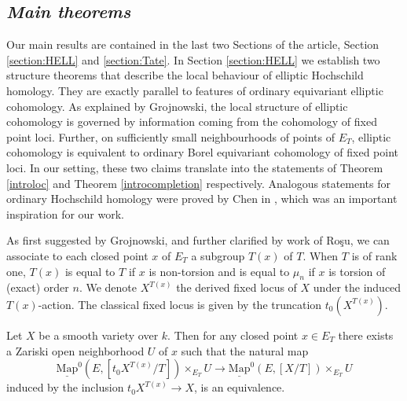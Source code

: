 \documentclass[11pt,letterpaper]{amsart}
\newenvironment{customthm}[1]
{\renewcommand\theinnercustomthm{#1}\innercustomthm}
  {\endinnercustomthm}
\newtheorem{remark}[dummy]{Remark}
\newcommand{\Mapo}[2]{\underline{\mathrm{Map}}^{0}\left (#1,#2\right )}
\begin{document}

\subsection*{\emph{Main theorems}} Our main results  are contained in the last two Sections of the article, Section \ref{section:HELL} and \ref{section:Tate}. 
In Section  \ref{section:HELL}  we establish two structure theorems that describe the local behaviour of elliptic Hochschild  homology. They are exactly parallel to features of ordinary equivariant elliptic cohomology. As explained by Grojnowski, the local structure of elliptic cohomology is governed by information coming from the cohomology of fixed point loci. Further, on sufficiently small   neighbourhoods of points of $E_T$, elliptic cohomology is equivalent to  ordinary Borel equivariant cohomology of fixed point loci. In our setting, these two claims translate into the statements of Theorem \ref{introloc} and Theorem \ref{introcompletion} respectively.   Analogous statements for ordinary Hochschild homology were proved by Chen in \cite{HChen}, which was an important inspiration for our work.

As first suggested by Grojnowski, and further clarified  by work of Ro\c{s}u, we can associate to each closed point $x$ of $E_T$ a subgroup $T(x)$ of $T$.  When $T$ is of rank one, $T(x)$ is  equal to $T$ if $x$ is non-torsion and is equal to 
$\mu_n$  %
if $x$ is torsion of (exact) order $n$. We denote $X^{T(x)}$ the derived fixed locus of $X$ under the induced $T(x)$-action. The classical fixed locus is given by the truncation $t_0(X^{T(x)})$.  

\begin{customthm}{E}
[Theorem \ref{proposition:localization}]
\label{introloc}
Let $X$ be a  smooth variety over $k$. Then for any closed point $x \in E_T$ there exists a Zariski open neighborhood $U$ of $x$ such that the natural map
\begin{equation}\label{eq:locmap}
\Mapo{E}{[t_0X^{T(x)}/T]}\times_{E_T} U\rightarrow\Mapo{E}{[X/T]}\times_{E_T} U
\end{equation}
induced by the inclusion $t_0 X^{T(x)}\rightarrow X$, is an equivalence.
\end{customthm}
\end{document}
